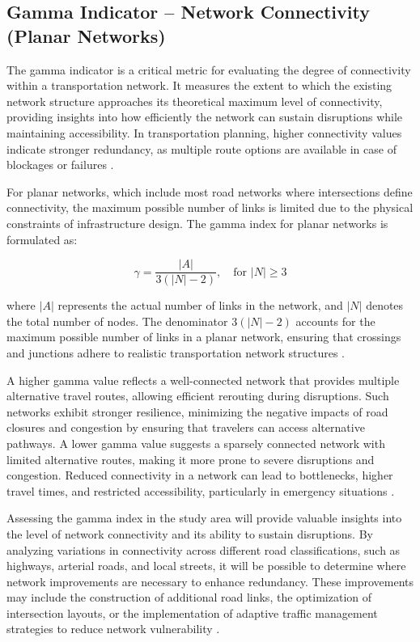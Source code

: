 \subsection{Gamma Indicator – Network Connectivity (Planar Networks)}
The gamma indicator is a critical metric for evaluating the degree of connectivity within a transportation network. It measures the extent to which the existing network structure approaches its theoretical maximum level of connectivity, providing insights into how efficiently the network can sustain disruptions while maintaining accessibility. In transportation planning, higher connectivity values indicate stronger redundancy, as multiple route options are available in case of blockages or failures \cite{taylor2017}.

For planar networks, which include most road networks where intersections define connectivity, the maximum possible number of links is limited due to the physical constraints of infrastructure design. The gamma index for planar networks is formulated as:

\begin{equation}
\gamma = \frac{|A|}{3(|N| - 2)}, \quad \text{for } |N| \geq 3
\end{equation}

where \( |A| \) represents the actual number of links in the network, and \( |N| \) denotes the total number of nodes. The denominator \( 3(|N| - 2) \) accounts for the maximum possible number of links in a planar network, ensuring that crossings and junctions adhere to realistic transportation network structures \cite{derrible2010}.

A higher gamma value reflects a well-connected network that provides multiple alternative travel routes, allowing efficient rerouting during disruptions. Such networks exhibit stronger resilience, minimizing the negative impacts of road closures and congestion by ensuring that travelers can access alternative pathways. A lower gamma value suggests a sparsely connected network with limited alternative routes, making it more prone to severe disruptions and congestion. Reduced connectivity in a network can lead to bottlenecks, higher travel times, and restricted accessibility, particularly in emergency situations \cite{taylor2017}.

Assessing the gamma index in the study area will provide valuable insights into the level of network connectivity and its ability to sustain disruptions. By analyzing variations in connectivity across different road classifications, such as highways, arterial roads, and local streets, it will be possible to determine where network improvements are necessary to enhance redundancy. These improvements may include the construction of additional road links, the optimization of intersection layouts, or the implementation of adaptive traffic management strategies to reduce network vulnerability \cite{taylor2017}.

